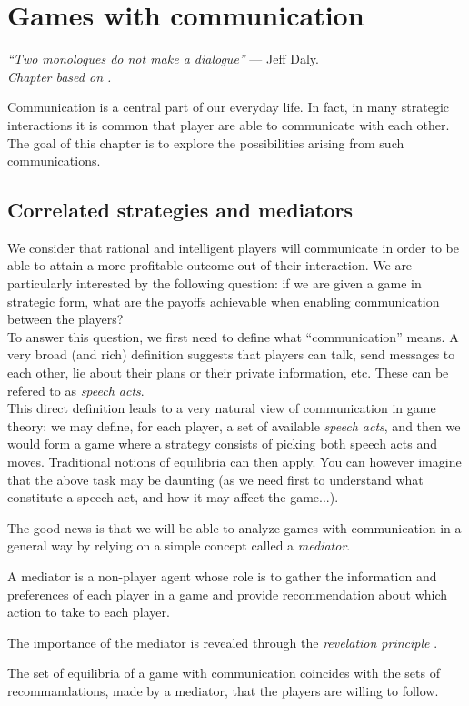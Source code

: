 \ifx \globalmark \undefined %
	
\else
\fi


\chapter{Games with communication}
{\large{\itshape
``Two monologues do not make a dialogue''} --- Jeff Daly.\\
}
\label{chap:Cor}
  {\small{\itshape
Chapter based on \cite[pages 244 to 263]{MyGTAO}.}\\
}

Communication is a central part of our everyday life. In fact, in many strategic interactions it is common that player are able to communicate with each other.
The goal of this chapter is to explore the possibilities arising from such communications.

\section{Correlated strategies and mediators}


We consider that rational and intelligent players will communicate in order to be able to attain a more profitable outcome out of their interaction.
We are particularly interested by the following question: if we are given a game in strategic form, what are the payoffs achievable when enabling communication between the players?\\
To answer this question, we first need to define what ``communication'' means. A very broad (and rich) definition suggests that players can talk, send messages to each other, lie about their plans or their private information, etc. These can be refered to as \emph{speech acts}.\\
This direct definition leads to a very natural view of communication in game theory: we may define, for each player, a set of available \emph{speech acts}, and then we would form a game where a strategy consists of picking both speech acts and moves. Traditional notions of equilibria can then apply. You can however imagine that the above task may be daunting (as we need first to understand what constitute a speech act, and how it may affect the game...).

The good news is that we will be able to analyze games with communication in a general way by relying on a simple concept called a \emph{mediator}.
\begin{definition}
A mediator is a non-player agent whose role is to gather the information and preferences of each player in a game and provide recommendation about which action to take to each player.
\end{definition}
The importance of the mediator is revealed through the \emph{revelation principle} \cite[page 257]{MyGTAO}.
\begin{definition}
The set of equilibria of a game with communication coincides with the sets of recommandations, made by a mediator, that the players are willing to follow.
\end{definition}

